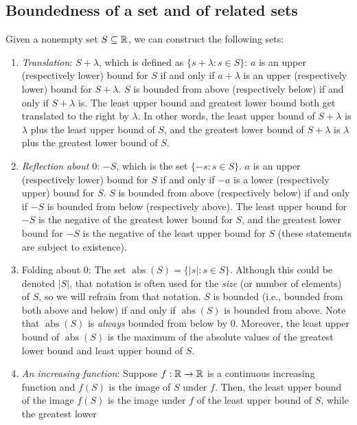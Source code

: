 \documentclass{amsart}
\begin{document}
\subsection{Boundedness of a set and of related sets}

Given a nonempty set $S \subseteq \mathbb{R}$, we can construct the following sets:

\begin{enumerate}
\item {\em Translation}: $S + \lambda$, which is defined as $\{ s +
  \lambda : s \in S \}$: $a$ is an upper (respectively lower) bound
  for $S$ if and only if $a + \lambda$ is an upper (respectively
  lower) bound for $S + \lambda$. $S$ is bounded from above
  (respectively below) if and only if $S + \lambda$ is. The least
  upper bound and greatest lower bound both get translated to the
  right by $\lambda$. In other words, the least upper bound of $S +
  \lambda$ is $\lambda$ plus the least upper bound of $S$, and the
  greatest lower bound of $S + \lambda$ is $\lambda$ plus the greatest
  lower bound of $S$.
\item {\em Reflection about $0$}: $-S$, which is the set $\{ -s : s
  \in S \}$. $a$ is an upper (respectively lower) bound for $S$ if and
  only if $-a$ is a lower (respectively upper) bound for $S$. $S$ is
  bounded from above (respectively below) if and only if $-S$ is
  bounded from below (respectively above). The least upper bound for
  $-S$ is the negative of the greatest lower bound for $S$, and the
  greatest lower bound for $-S$ is the negative of the least upper
  bound for $S$ (these statements are subject to existence).
\item {Folding about $0$}: The set $\operatorname{abs}(S) = \{ |s| : s
  \in S \}$. Although this could be denoted $|S|$, that notation is
  often used for the {\em size} (or number of elements) of $S$, so we
  will refrain from that notation. $S$ is bounded (i.e., bounded from
  both above and below) if and only if $\operatorname{abs}(S)$ is
  bounded from above. Note that $\operatorname{abs}(S)$ is {\em
  always} bounded from below by $0$. Moreover, the least upper bound
  of $\operatorname{abs}(S)$ is the maximum of the absolute values of
  the greatest lower bound and least upper bound of $S$.
\item {\em An increasing function}: Suppose $f:\mathbb{R} \to \mathbb{R}$ is a
  continuous increasing function and $f(S)$ is the image of $S$ under
  $f$. Then, the least upper bound of the image $f(S)$ is the image
  under $f$ of the least upper bound of $S$, while the greatest lower

\end{enumerate}
\end{document}
